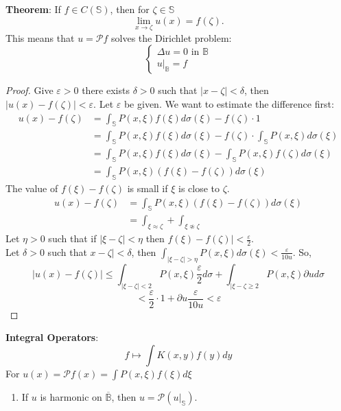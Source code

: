 \documentclass[12pt]{article}
\begin{document}
\noindent \textbf{Theorem}: If $f \in C(\mathbb{S})$, then for $\zeta \in \mathbb{S}$
$$\lim_{x \rightarrow \zeta} u(x) = f(\zeta).$$
This means that $u = \mathcal{P}f$ solves the Dirichlet problem:
$$\begin{cases}
\Delta u = 0 \text{ in } \mathbb{B} \\
u\vert_\mathbb{B} = f 
\end{cases} $$
\begin{proof}
Give $\varepsilon >0$ there exists $\delta > 0$ such that $\vert x - \zeta \vert < \delta$, then $\vert u(x) - f(\zeta) \vert < \varepsilon$. Let $\varepsilon$ be given. We want to estimate the difference first:
\begin{align*}
u(x)-f(\zeta) 
&= \int_\mathbb{S} P (x, \xi) f(\xi) d\sigma(\xi) - f(\zeta)\cdot 1 \\
&= \int_\mathbb{S} P (x, \xi) f(\xi) d\sigma(\xi) - f(\zeta)\cdot \int_\mathbb{S} P(x, \xi) d\sigma(\xi) \\
&= \int_\mathbb{S} P (x, \xi) f(\xi) d\sigma(\xi) - \int_\mathbb{S} P(x, \xi) f(\zeta) d\sigma(\xi) \\
&= \int_\mathbb{S} P (x, \xi)( f(\xi) - f(\zeta)) d\sigma(\xi) 
\end{align*}
The value of $f(\xi) - f(\zeta)$ is small if $\xi$ is close to $\zeta$.
\begin{align*}
u(x)-f(\zeta) &= \int_\mathbb{S} P (x, \xi)( f(\xi) - f(\zeta)) d\sigma(\xi) \\
&= \int_{\xi \approx \zeta} + \int_{\xi \not\approx \zeta}
\end{align*}
Let $\eta > 0$ such that if $\vert \xi - \zeta \vert < \eta$ then $f(\xi) - f(\zeta) \vert < \frac{\varepsilon}{2}$. \\
Let $\delta > 0$ such that $x - \zeta\vert < \delta$, then $\int_{\vert \xi - \zeta \vert > \eta} P(x,\xi) d\sigma(\xi) < \frac{\varepsilon}{10u}$. So,
$$\vert u(x) - f(\zeta) \vert \leq \int_{\vert \xi-\zeta \vert < 2} P(x,\xi) \frac{\varepsilon}{2} d\sigma + \int_{\vert \xi - \zeta \geq 2} P(x,\xi) \partial u d\sigma $$
$$ < \frac{\varepsilon}{2} \cdot 1 + \partial u \frac{\varepsilon}{10u} < \varepsilon$$
\end{proof}
\noindent \textbf{Integral Operators}:
$$ f \mapsto \int K(x,y) f(y) dy$$
For $u(x) = \mathcal{P}f(x) = \int P(x,\xi)f(\xi)d\xi$
\begin{enumerate}
\addtocounter{enumi}{5}
\item If $u$ is harmonic on $\overline{\mathbb{B}}$, then $u = \mathcal{P}(u\vert_\mathbb{S})$.
\end{enumerate}
\end{document}
